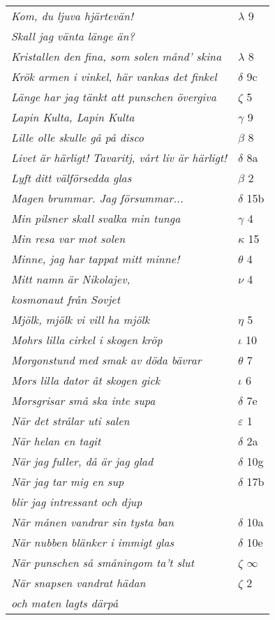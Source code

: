 \documentclass[a6paper,10pt]{article}
\begin{document}
\newpage
\setlength{\oddsidemargin}{-0.47in}
\begin{table}[!h]
\begin{tabular}{l l}
\textit{Kom, du ljuva hjärtevän!}	&$\lambda$ 9\\
\textit{Skall jag vänta länge än?} &\\
\textit{Kristallen den fina, som solen månd' skina}	&$\lambda$ 8\\
\textit{Krök armen i vinkel, här vankas det finkel}	&$\delta$ 9c\\
\textit{Länge har jag tänkt att punschen övergiva}	&$\zeta$ 5\\
\textit{Lapin Kulta, Lapin Kulta}	&$\gamma$ 9\\
\textit{Lille olle skulle gå på disco}	&$\beta$ 8\\
\textit{Livet är härligt! Tavaritj, vårt liv är härligt!}	&$\delta$ 8a\\
\textit{Lyft ditt välförsedda glas}	&$\beta$ 2\\
\textit{Magen brummar. Jag försummar...}	&$\delta$ 15b\\
\textit{Min pilsner skall svalka min tunga}	&$\gamma$ 4\\
\textit{Min resa var mot solen} &$\kappa$ 15\\
\textit{Minne, jag har tappat mitt minne!}	&$\theta$ 4\\
\textit{Mitt namn är Nikolajev,}	&$\nu$ 4\\
\textit{kosmonaut från Sovjet} &\\
\textit{Mjölk, mjölk vi vill ha mjölk}	&$\eta$ 5\\
\textit{Mohrs lilla cirkel i skogen kröp}	&$\iota$ 10\\
\textit{Morgonstund med smak av döda bävrar}	&$\theta$ 7\\
\textit{Mors lilla dator åt skogen gick}	&$\iota$ 6\\
\textit{Morsgrisar små ska inte supa}	&$\delta$ 7e\\
\textit{När det strålar uti salen}	&$\varepsilon$ 1\\
\textit{När helan en tagit}	&$\delta$ 2a\\
\textit{När jag fuller, då är jag glad}	&$\delta$ 10g\\
\textit{När jag tar mig en sup}	&$\delta$ 17b\\
\textit{blir jag intressant och djup} &\\
\textit{När månen vandrar sin tysta ban}	&$\delta$ 10a\\
\textit{När nubben blänker i immigt glas}	&$\delta$ 10e\\
\textit{När punschen så småningom ta't slut}	&$\zeta$ $\infty$\\
\textit{När snapsen vandrat hädan}	&$\zeta$ 2\\
\textit{och maten lagts därpå} &\\
\end{tabular}
\end{table}
\end{document}
